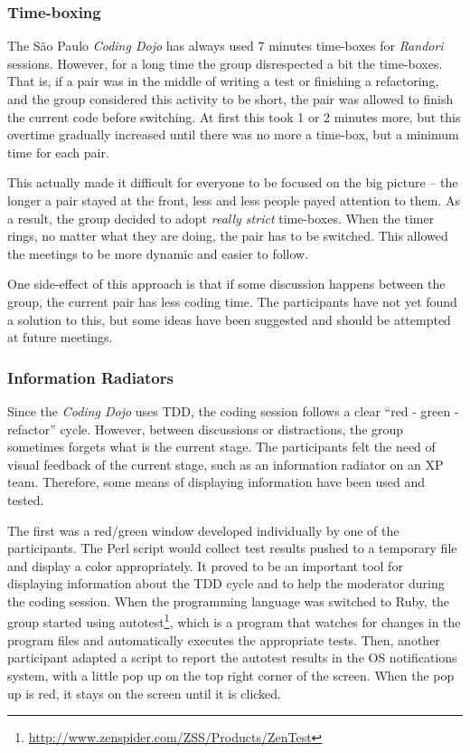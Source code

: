 \subsubsection{Time-boxing}

The São Paulo \emph{Coding Dojo} has always used 7 minutes time-boxes
for \emph{Randori} sessions. However, for a long time the group
disrespected a bit the time-boxes. That is, if a pair was in the
middle of writing a test or finishing a refactoring, and the group
considered this activity to be short, the pair was allowed to finish
the current code before switching. At first this took 1 or 2 minutes
more, but this overtime gradually increased until there was no more a
time-box, but a minimum time for each pair.

This actually made it difficult for everyone to be focused on the big
picture -- the longer a pair stayed at the front, less and less people
payed attention to them. As a result, the group decided to adopt
\emph{really strict} time-boxes. When the timer rings, no matter
what they are doing, the pair has to be switched. This allowed the
meetings to be more dynamic and easier to follow.

One side-effect of this approach is that if some discussion happens
between the group, the current pair has less coding time. The
participants have not yet found a solution to this, but some ideas
have been suggested and should be attempted at future meetings.

\subsubsection{Information Radiators}

Since the \emph{Coding Dojo} uses TDD, the coding session follows a
clear ``red - green - refactor'' cycle. However, between discussions or
distractions, the group sometimes forgets what is the current
stage. The participants felt the need of visual feedback of the
current stage, such as an information radiator on an XP team. Therefore,
some means of displaying information have been used and tested.

The first was a red/green window developed individually by one of the
participants. The Perl script would collect test results pushed to a
temporary file and display a color appropriately. It proved to be an
important tool for displaying information about the TDD cycle and
to help the moderator during the coding session. When the programming
language was switched to Ruby, the group started using
autotest\footnote{\url{http://www.zenspider.com/ZSS/Products/ZenTest}},
which is a program that watches for changes in the program files and
automatically executes the appropriate tests. Then, another participant
adapted a script to report the autotest results in the OS notifications
system, with a little pop up on the top right corner of the screen. When
the pop up is red, it stays on the screen until it is clicked.

